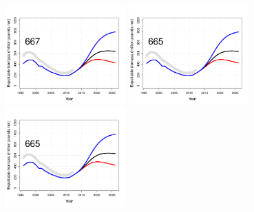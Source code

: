 \label{sub:effects_of_bycatch_reduction_on_ebio}
\begin{figure}[htbp]
	\centering
		\includegraphics[height=1.5in]{../FIGURES/fig_SQUO_DI_EBio.pdf}
		\includegraphics[height=1.5in]{../FIGURES/fig_BSAI_DI_EBio.pdf}
		\includegraphics[height=1.5in]{../FIGURES/fig_GULF_DI_EBio.pdf}
		

\end{figure}
